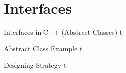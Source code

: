 \documentclass[../lecture5-objectorientation.tex]{subfiles}
\begin{document}
\section{Interfaces}


\begin{frame}[fragile]{Interfaces in C++ (Abstract Classes)}
t
\end{frame}


\begin{frame}[fragile]{Abstract Class Example}
t
\end{frame}


\begin{frame}[fragile]{Designing Strategy}
t
\end{frame}

\end{document}
